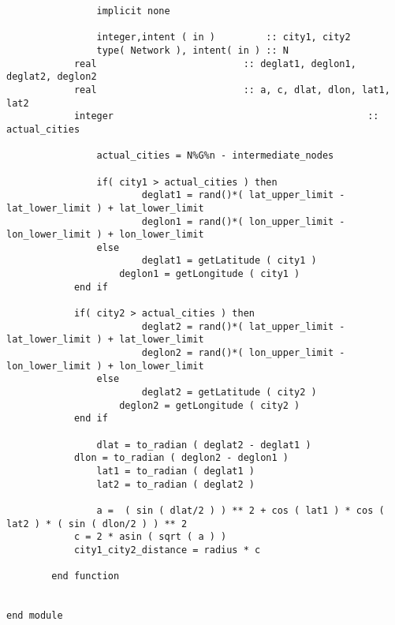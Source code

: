 \documentclass[10pt,a4paper,margin = 1.25cm]{article}
\begin{document}
\begin{lstlisting}
				implicit none
				
				integer,intent ( in )         :: city1, city2
				type( Network ), intent( in ) :: N
    		real                          :: deglat1, deglon1, deglat2, deglon2
     		real                          :: a, c, dlat, dlon, lat1, lat2
     		integer												:: actual_cities
				
				actual_cities = N%G%n - intermediate_nodes
				
				if( city1 > actual_cities ) then
						deglat1 = rand()*( lat_upper_limit - lat_lower_limit ) + lat_lower_limit
						deglon1 = rand()*( lon_upper_limit - lon_lower_limit ) + lon_lower_limit
				else 
						deglat1 = getLatitude ( city1 )
		     		deglon1 = getLongitude ( city1 )
		    end if
		    
		    if( city2 > actual_cities ) then
						deglat2 = rand()*( lat_upper_limit - lat_lower_limit ) + lat_lower_limit
						deglon2 = rand()*( lon_upper_limit - lon_lower_limit ) + lon_lower_limit
				else 
						deglat2 = getLatitude ( city2 )
		     		deglon2 = getLongitude ( city2 )
		    end if
     										
				dlat = to_radian ( deglat2 - deglat1 )
     		dlon = to_radian ( deglon2 - deglon1 )
				lat1 = to_radian ( deglat1 )
				lat2 = to_radian ( deglat2 )
								
				a =  ( sin ( dlat/2 ) ) ** 2 + cos ( lat1 ) * cos ( lat2 ) * ( sin ( dlon/2 ) ) ** 2
     		c = 2 * asin ( sqrt ( a ) )
     		city1_city2_distance = radius * c
     		
		end function
				 
				 
end module
		
\end{lstlisting}
\end{document}
